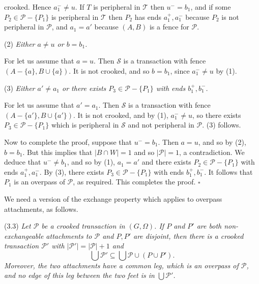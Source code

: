 \noindent crooked. Hence $a_1^- \ne u$. If $T$ is peripheral in $\mathscr{T}$ then $u^- = b_1$, and if some $P_2 \in \mathscr{P} - \{P_1\}$ is peripheral in $\mathscr{T}$ then $P_2$ has ends $a_1^+, a_1^-$ because $P_2$ is not peripheral in $\mathscr{P}$, and $a_1 = a'$ because $(A, B)$ is a fence for $\mathscr{P}$.

\hspace*{12pt}(2) \textit{Either $a \ne u$ or $b = b_1$.}

For let us assume that $a = u$. Then $\mathscr{S}$ is a transaction with fence $(A - \{a\}, B \cup \{a\})$. It is not crooked, and so $b = b_1$, since $a_1^- \ne u$ by (1).

\hspace*{12pt}(3) \textit{Either $a' \ne a_1$ or there exists $P_3 \in \mathscr{P} - \{P_1\}$ with ends $b_1^+, b_1^-$.}

For let us assume that $a' = a_1$. Then $\mathscr{S}$ is a transaction with fence $(A - \{a'\}, B \cup \{a'\})$. It is not crooked, and by (1), $a_1^- \ne u$, so there exists $P_3 \in \mathscr{P} - \{P_1\}$ which is peripheral in $\mathscr{S}$ and not peripheral in $\mathscr{P}$. (3) follows.

Now to complete the proof, suppose that $u^- = b_1$. Then $a = u$, and so by (2), $b = b_1$. But this implies that $|B \cap W| = 1$ and so $|\mathscr{P}| = 1$, a contradiction. We deduce that $u^- \ne b_1$, and so by (1), $a_1 = a'$ and there exists $P_2 \in \mathscr{P} - \{P_1\}$ with ends $a_1^+, a_1^-$. By (3), there exists $P_3 \in \mathscr{P} - \{P_1\}$ with ends $b_1^+, b_1^-$. It follows that $P_1$ is an overpass of $\mathscr{P}$, as required. This completes the proof. $\square$

We need a version of the exchange property which applies to overpass attachments, as follows.

\stmt
(3.3) \textit{Let $\mathscr{P}$ be a crooked transaction in $(G, \Omega)$. If $P$ and $P'$ are both non-exchangeable attachments to $\mathscr{P}$ and $P, P'$ are disjoint, then there is a crooked transaction $\mathscr{P}'$ with $|\mathscr{P}'| = |\mathscr{P}| + 1$ and}
\begin{equation*}
\bigcup \mathscr{P}' \subseteq \bigcup \mathscr{P} \cup (P \cup P').
\end{equation*}
\textit{Moreover, the two attachments have a common leg, which is an overpass of $\mathscr{P}$, and no edge of this leg between the two feet is in $\bigcup \mathscr{P}'$.}

